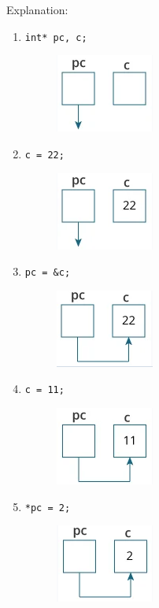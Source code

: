 Explanation:\\
\begin{enumerate}
    \item \verb|int* pc, c;|
          \begin{figure}[H]
              \centering
              \includegraphics[width=0.2\linewidth]{P4/img/screenshot001.png}
              \caption{}
              \label{fig:satu}
          \end{figure}
    \item \verb|c = 22;|
          \begin{figure}[H]
              \centering
              \includegraphics[width=0.2\linewidth]{P4/img/screenshot002.png}
              \caption{}
              \label{fig:dua}
          \end{figure}
    \item \verb|pc = &c;|
          \begin{figure}[H]
              \centering
              \includegraphics[width=0.2\linewidth]{P4/img/screenshot003.png}
              \caption{}
              \label{fig:tiga}
          \end{figure}
    \item \verb|c = 11;|
          \begin{figure}[H]
              \centering
              \includegraphics[width=0.2\linewidth]{P4/img/screenshot004.png}
              \caption{}
              \label{fig:empat}
          \end{figure}
    \item \verb|*pc = 2;|
          \begin{figure}[H]
              \centering
              \includegraphics[width=0.2\linewidth]{P4/img/screenshot005.png}
              \caption{}
              \label{fig:lima}
          \end{figure}
\end{enumerate}

